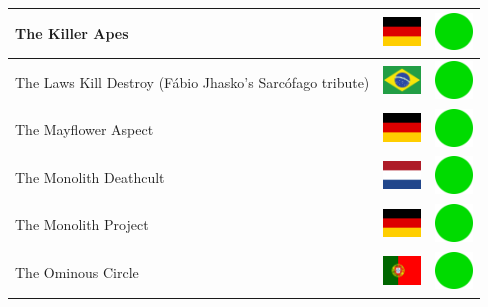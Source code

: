 \documentclass[12pt, a4paper, twoside]{report}
\begin{document}
\begin{center}
\begin{longtable}{|p{5cm}|p{2cm}|p{2cm}|}
 The Killer Apes                                            & \includegraphics[width=1cm]{../img/flags/de} &   \includegraphics[width=1cm]{../likes/y} \\ \hline
 The Laws Kill Destroy (Fábio Jhasko's Sarcófago tribute)   & \includegraphics[width=1cm]{../img/flags/br} &   \includegraphics[width=1cm]{../likes/y} \\ \hline
 The Mayflower Aspect                                       & \includegraphics[width=1cm]{../img/flags/de} &   \includegraphics[width=1cm]{../likes/y} \\ \hline
 The Monolith Deathcult                                     & \includegraphics[width=1cm]{../img/flags/nl} &   \includegraphics[width=1cm]{../likes/y} \\ \hline
 The Monolith Project                                       & \includegraphics[width=1cm]{../img/flags/de} &   \includegraphics[width=1cm]{../likes/y} \\ \hline
 The Ominous Circle                                         & \includegraphics[width=1cm]{../img/flags/pt} &   \includegraphics[width=1cm]{../likes/y} \\ \hline

\end{longtable}
\end{center}
\end{document}
